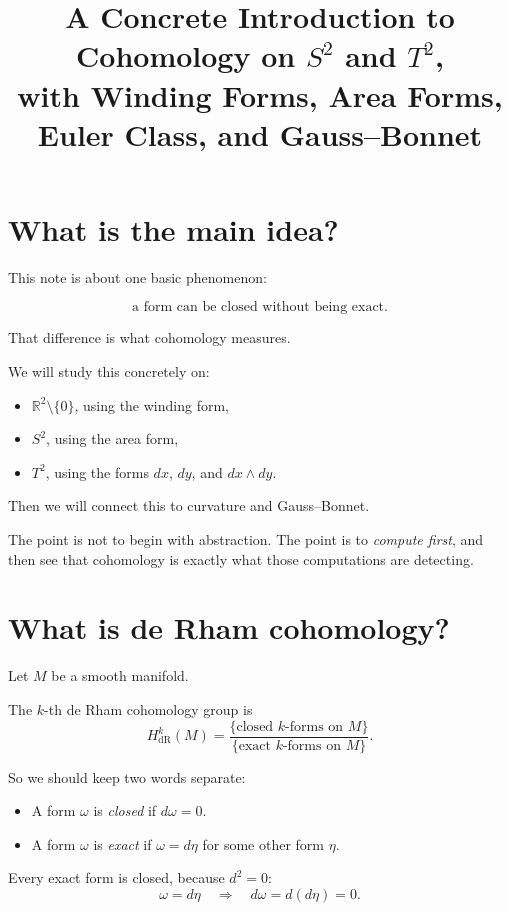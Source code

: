 \documentclass[11pt]{article}
\title{A Concrete Introduction to Cohomology on \(S^2\) and \(T^2\),\\
	with Winding Forms, Area Forms, Euler Class, and Gauss--Bonnet}
\author{}
\date{}
\begin{document}
	\maketitle
	
	\tableofcontents
	
	\section{What is the main idea?}
	
	This note is about one basic phenomenon:
	
	\[
	\boxed{\text{a form can be closed without being exact}.}
	\]
	
	That difference is what cohomology measures.
	
	We will study this concretely on:
	\begin{itemize}[leftmargin=2em]
		\item \(\mathbb{R}^2\setminus\{0\}\), using the winding form,
		\item \(S^2\), using the area form,
		\item \(T^2\), using the forms \(dx\), \(dy\), and \(dx\wedge dy\).
	\end{itemize}
	
	Then we will connect this to curvature and Gauss--Bonnet.
	
	The point is not to begin with abstraction. The point is to \emph{compute first}, and then see that cohomology is exactly what those computations are detecting.
	
	\section{What is de Rham cohomology?}
	
	Let \(M\) be a smooth manifold.
	
	The \(k\)-th de Rham cohomology group is
	\[
	H^k_{\mathrm{dR}}(M)
	=
	\frac{\{\text{closed }k\text{-forms on }M\}}{\{\text{exact }k\text{-forms on }M\}}.
	\]
	
	So we should keep two words separate:
	
	\begin{itemize}[leftmargin=2em]
		\item A form \(\omega\) is \emph{closed} if \(d\omega=0\).
		\item A form \(\omega\) is \emph{exact} if \(\omega=d\eta\) for some other form \(\eta\).
	\end{itemize}
	
	Every exact form is closed, because \(d^2=0\):
	\[
	\omega=d\eta \quad\Longrightarrow\quad d\omega=d(d\eta)=0.
	\]
	
\end{document}
